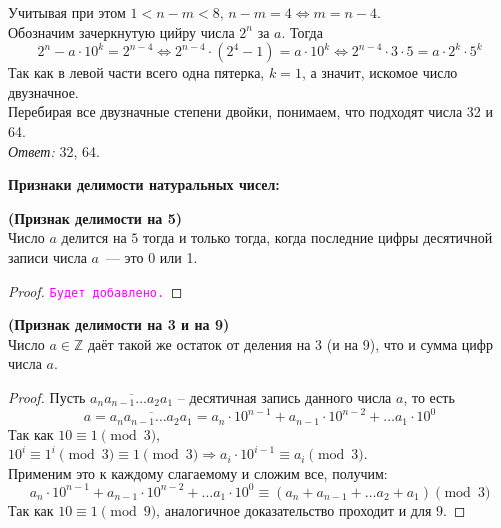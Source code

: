 \documentclass[11pt]{article}
\begin{document}
Учитывая при этом $1 < n - m < 8 $, $n - m = 4 \Leftrightarrow m = n - 4$.\\
Обозначим зачеркнутую цийру числа $2^n$ за $a$. Тогда
\[2^n - a \cdot 10^k = 2^{n - 4} \Leftrightarrow
2^{n - 4} \cdot (2^{4} - 1) = a \cdot 10^k \Leftrightarrow
2^{n - 4} \cdot 3 \cdot 5 = a \cdot 2^k \cdot 5^k \]
Так как в левой части всего одна пятерка, $k = 1$, а значит, искомое число двузначное.\\
Перебирая все двузначные степени двойки, понимаем, что подходят числа 32 и 64.\\
\textit{Ответ:} 32, 64.

\textbf{Признаки делимости натуральных чисел:}

\begin{theorem} \textbf{(Признак делимости на 5)}\\
	Число $a$ делится на $5$ тогда и только тогда, когда последние цифры десятичной записи числа $a$~--- это 0 или 1.
\end{theorem}
\begin{proof}
    \textcolor{magenta}{\texttt{Будет добавлено.}}
\end{proof}

\begin{theorem}\textbf{(Признак делимости на 3 и на 9)}\\
	Число $a \in \mathbb{Z}$ даёт такой же остаток от деления на 3 (и на 9), что и сумма цифр числа $a$.
\end{theorem}

\begin{proof}

	Пусть $\overline{a_na_{n - 1}\ldots a_2 a_1}$ -- десятичная запись данного числа $a$, то есть
	\[a = \overline{a_na_{n - 1}\ldots a_2 a_1} = a_n \cdot 10^{n - 1} + a_{n - 1}\cdot 10^{n - 2} + \ldots a_1 \cdot 10^0 \]
	Так как $10 \equiv 1 \pmod 3$, $10^{i} \equiv 1^{i} \pmod 3 \equiv 1 \pmod 3 \Rightarrow a_i \cdot 10^{i - 1} \equiv a_i \pmod 3$.  \\
	Применим это к каждому слагаемому и сложим все, получим:\\
	\[a_n \cdot 10^{n - 1} + a_{n - 1}\cdot 10^{n - 2} + \ldots a_1 \cdot 10^0 \equiv (a_n + a_{n - 1} + \ldots  a_2 + a_1) \pmod 3\]
	Так как $10 \equiv 1 \pmod{9}$, аналогичное доказательство проходит и для $9$.

\end{proof}
\end{document}
